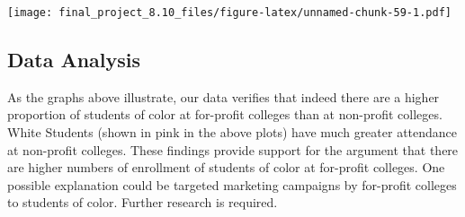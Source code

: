 \documentclass[
]{article}
\newenvironment{Shaded}{\begin{snugshade}}{\end{snugshade}}
\newcommand{\DataTypeTok}[1]{\textcolor[rgb]{0.13,0.29,0.53}{#1}}
\newcommand{\DecValTok}[1]{\textcolor[rgb]{0.00,0.00,0.81}{#1}}
\newcommand{\FloatTok}[1]{\textcolor[rgb]{0.00,0.00,0.81}{#1}}
\newcommand{\KeywordTok}[1]{\textcolor[rgb]{0.13,0.29,0.53}{\textbf{#1}}}
\newcommand{\NormalTok}[1]{#1}
\newcommand{\OperatorTok}[1]{\textcolor[rgb]{0.81,0.36,0.00}{\textbf{#1}}}
\newcommand{\StringTok}[1]{\textcolor[rgb]{0.31,0.60,0.02}{#1}}
\begin{document}
\begin{Shaded}
\end{Shaded}

\texttt{[image: final\_project\_8.10\_files/figure-latex/unnamed-chunk-59-1.pdf]}

\hypertarget{data-analysis}{%
\subsection{\texorpdfstring{\textbf{Data
Analysis}}{Data Analysis}}\label{data-analysis}}

As the graphs above illustrate, our data verifies that indeed there are
a higher proportion of students of color at for-profit colleges than at
non-profit colleges. White Students (shown in pink in the above plots)
have much greater attendance at non-profit colleges. These findings
provide support for the argument that there are higher numbers of
enrollment of students of color at for-profit colleges. One possible
explanation could be targeted marketing campaigns by for-profit colleges
to students of color. Further research is required.
\end{document}

